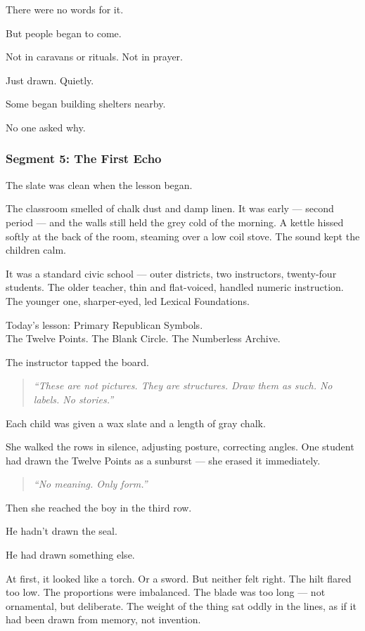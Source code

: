 \documentclass[9pt]{article}
\begin{document}
There were no words for it.

But people began to come.

Not in caravans or rituals. Not in prayer.

Just drawn. Quietly.

Some began building shelters nearby.

No one asked why.

\newpage

\subsubsection*{Segment 5: The First Echo}

The slate was clean when the lesson began.

The classroom smelled of chalk dust and damp linen. It was early --- second period --- and the walls still held the grey cold of the morning. A kettle hissed softly at the back of the room, steaming over a low coil stove. The sound kept the children calm.

It was a standard civic school --- outer districts, two instructors, twenty-four students. The older teacher, thin and flat-voiced, handled numeric instruction. The younger one, sharper-eyed, led Lexical Foundations.

Today’s lesson: Primary Republican Symbols.\\
The Twelve Points. The Blank Circle. The Numberless Archive.

The instructor tapped the board.

\begin{quote}
\textit{“These are not pictures. They are structures. Draw them as such. No labels. No stories.”}
\end{quote}

Each child was given a wax slate and a length of gray chalk.

She walked the rows in silence, adjusting posture, correcting angles. One student had drawn the Twelve Points as a sunburst --- she erased it immediately.

\begin{quote}
\textit{“No meaning. Only form.”}
\end{quote}

Then she reached the boy in the third row.

He hadn’t drawn the seal.

He had drawn something else.

At first, it looked like a torch. Or a sword. But neither felt right. The hilt flared too low. The proportions were imbalanced. The blade was too long --- not ornamental, but deliberate. The weight of the thing sat oddly in the lines, as if it had been drawn from memory, not invention.
\end{document}
